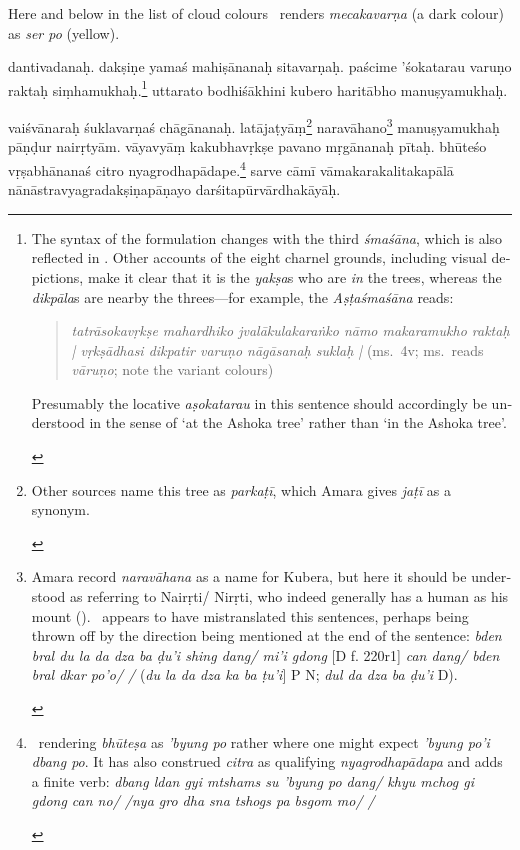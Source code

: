 \documentclass[naipra.tex]{subfiles}
\begin{document}
\begin{sanskrit}
{\begin{english}
		Here and below in the list of cloud colours \TIB\ renders \emph{mecakavarṇa} (a dark colour) as \emph{ser po} (yellow).
	\end{english}
} dantivadanaḥ.
dakṣiṇe yamaś  mahiṣānanaḥ sitavarṇaḥ.
paścime 'śokatarau varuṇo raktaḥ siṃhamukhaḥ.\footnote{
	\begin{english}%
		The syntax of the formulation changes with the third \emph{śmaśāna}, which is also reflected in \TIB .
		Other accounts of the eight charnel grounds, including visual depictions, make it clear that it is the \emph{yakṣa}s who are \emph{in} the trees, whereas the \emph{dikpāla}s are nearby the threes—for example, the \emph{Aṣṭaśmaśāna} reads:

		\begin{quote}
			\emph{tatrāsokavṛkṣe mahardhiko jvalākulakaraṅko nāmo makaramukho raktaḥ | vṛkṣādhasi dikpatir varuṇo nāgāsanaḥ suklaḥ |} (ms.\ 4v; ms.\ reads \emph{vāruṇo}; note the variant colours)
		\end{quote}

		\noindent Presumably the locative \emph{aṣokatarau} in this sentence should accordingly be understood in the sense of `at the Ashoka tree' rather than `in the Ashoka tree'.
	\end{english}
}
uttarato bodhiśākhini kubero haritābho manuṣyamukhaḥ.  
\pend

\pstart
{}  vaiśvānaraḥ śuklavarṇaś chāgānanaḥ.
latājaṭyāṃ\footnote{
	\begin{english}%
		Other sources name this tree as \emph{parkaṭī}, which Amara gives \emph{jaṭī} as a synonym.
	\end{english}
} naravāhano\footnote{
	\begin{english}%
		Amara record \emph{naravāhana} as a name for Kubera, but here it should be understood as referring to Nairṛti/ Nirṛti, who indeed generally has a human as his mount (\cite[98 ff.]{wesselsmevissen2001}). \TIB\ appears to have mistranslated this sentences, perhaps being thrown off by the direction being mentioned at the end of the sentence: \emph{bden bral du la da dza ba ḍu'i shing dang/ mi'i gdong} [D f. 220r1] \emph{can dang/ bden bral dkar po'o/ /} (\emph{du la da dza ka ba ṭu'i}] P N; \emph{dul da dza ba ḍu'i} D).
	\end{english}
} manuṣyamukhaḥ pāṇḍur nairṛtyām.
vāyavyāṃ kakubhavṛkṣe pavano mṛgānanaḥ pītaḥ.
 bhūteśo vṛṣabhānanaś citro nyagrodhapādape.\footnote{
	\begin{english}%
		\TIB\ rendering \emph{bhūteṣa} as \emph{'byung po} rather where one might expect \emph{'byung po'i dbang po}. It has also construed \emph{citra} as qualifying \emph{nyagrodhapādapa} and adds a finite verb: \emph{dbang ldan gyi mtshams su 'byung po dang/ khyu mchog gi gdong can no/ /nya gro dha sna tshogs pa bsgom mo/ /}
	\end{english}
}
sarve cāmī vāmakarakalitakapālā nānāstravyagradakṣiṇapāṇayo darśitapūrvārdhakāyāḥ.
\pend


\end{sanskrit}
\end{document}
